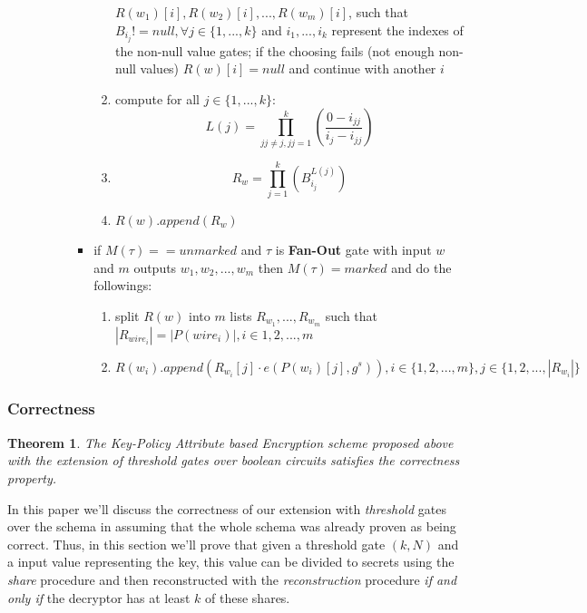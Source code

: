 \documentclass[12pt]{article}
\newtheorem{theorem}{Theorem}
\begin{document}
\begin{enumerate}
\begin{itemize}
\begin{itemize}
\begin{itemize}
\begin{enumerate}
				        $R(w_1)[i], R(w_2)[i], ..., R(w_m)[i]$, such that $B_{i_j} != null, \forall j \in \{1, ..., k\}$ and $i_1, ..., i_k$ represent the indexes of the non-null value gates; if the choosing fails (not enough non-null values) $R(w)[i] = null$ and continue with another $i$
				        \item compute for all $j \in \{1, ..., k\}$: $$L(j) = \prod_{jj \neq j, jj = 1}^{k}(\frac{0 - i_{jj}}{i_j - i_{jj}})$$ 
				        \item $$R_w = \prod_{j = 1}^{k} (B_{i_j} ^{L(j)})$$
				        \item $R(w).append(R_w)$
				    \end{enumerate}
				    \item if $M(\tau) == unmarked$ and $\tau$ is \textbf{Fan-Out} gate with input $w$ and $m$ outputs $w_1, w_2, ..., w_m$ then $M(\tau) = marked$ and do the followings:
				    \begin{enumerate}
				        \item split $R(w)$ into  $m$ lists $R_{w_1}, ...,R_{w_m}$ such that $|R_{wire_i}| = |P(wire_i)|, i \in {1, 2, ..., m}$
				        \item $R(w_i).append(R_{w_i}[j] \cdot e(P(w_i)[j], g^s)), i \in \{1, 2, ..., m\}, j \in \{1, 2, ...,|R_{w_i}|\}$ 
				    \end{enumerate}
				\end{itemize}
			\end{itemize}
		\end{itemize}
\end{enumerate}

\subsubsection{Correctness}

\begin{theorem}
The \textit{Key-Policy Attribute based Encryption} scheme proposed above with the extension of threshold gates over boolean circuits satisfies the correctness property.
\end{theorem}

In this paper we'll discuss the correctness of our extension with \textit{threshold} gates over the schema in \cite{fltccd} assuming that the whole schema was already proven as being correct. Thus, in this section we'll prove that given a threshold gate $(k, N)$ and a input value representing the key, this value can be divided to secrets using the \textit{share} procedure and then reconstructed with the \textit{reconstruction} procedure \textit{if and only if} the decryptor has at least $k$ of these shares.
\end{document}
